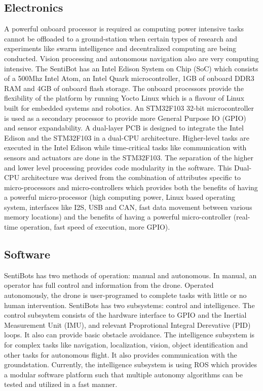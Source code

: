 \documentclass[12pt]{article}
\begin{document}
\subsection{Electronics}

A powerful onboard processor is required as computing power intensive tasks cannot be offloaded to a ground-station when certain types of research and experiments like swarm intelligence and decentralized computing\cite{swarm} are being conducted. Vision processing and autonomous navigation also are very computing intensive\cite{vision}. The SentiBot has an Intel Edison System on Chip (SoC) which consists of a 500Mhz Intel Atom, an Intel Quark microcontroller, 1GB of onboard DDR3 RAM and 4GB of onboard flash storage. The onboard processors provide the flexibility of the platform by running Yocto Linux which is a flavour of Linux built for embedded systems and robotics. An STM32F103 32-bit microcontroller is used as a secondary processor to provide more General Purpose IO (GPIO) and sensor expandability. A dual-layer PCB is designed to integrate the Intel Edison and the STM32F103 in a dual-CPU architecture. Higher-level tasks are executed in the Intel Edison while time-critical tasks like communication with sensors and actuators are done in the STM32F103. The separation of the higher and lower level processing provides code modularity in the software. This Dual-CPU architecture was derived from the combination of attributes specific to micro-processors and micro-controllers which provides both the benefits of having a powerful micro-processor (high computing power, Linux based operating system, interfaces like I2S, USB and CAN, fast data movement between various memory locations) and the benefits of having a powerful micro-controller (real-time operation, fast speed of execution, more GPIO). 

\subsection{Software}

SentiBots has two methods of operation: manual and autonomous. In manual, an operator has full control and information from the drone. Operated autonomously, the drone is user-programed to complete tasks with little or no human intervention. SentiBots has two subsystems: control and intelligence. The control subsystem consists of the hardware interface to GPIO and the Inertial Measurement Unit (IMU), and relevant Proprotional Integral Derevative (PID) loops. It also can provide basic obstacle avoidance. The intelligence subsystem is for complex tasks like navigation, localization, vision, object identification and other tasks for autonomous flight. It also provides communication with the groundstation. Currently, the intelligence subsystem is using ROS which provides a modular software platform such that multiple autonomy algorithms can be tested and utilized in a fast manner.
\end{document}
